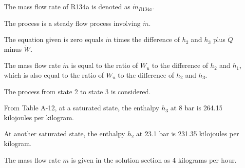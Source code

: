 The mass flow rate of R134a is denoted as \(\dot{m}_{R134a}\).

The process is a steady flow process involving \(\dot{m}\).

The equation given is zero equals \(\dot{m}\) times the difference of \(h_2\) and \(h_3\) plus \(\dot{Q}\) minus \(\dot{W}\).

The mass flow rate \(\dot{m}\) is equal to the ratio of \(\dot{W}_u\) to the difference of \(h_2\) and \(h_1\), which is also equal to the ratio of \(\dot{W}_u\) to the difference of \(h_2\) and \(h_3\).

The process from state 2 to state 3 is considered.

From Table A-12, at a saturated state, the enthalpy \(h_3\) at 8 bar is 264.15 kilojoules per kilogram.

At another saturated state, the enthalpy \(h_2\) at 23.1 bar is 231.35 kilojoules per kilogram.

The mass flow rate \(\dot{m}\) is given in the solution section as 4 kilograms per hour.